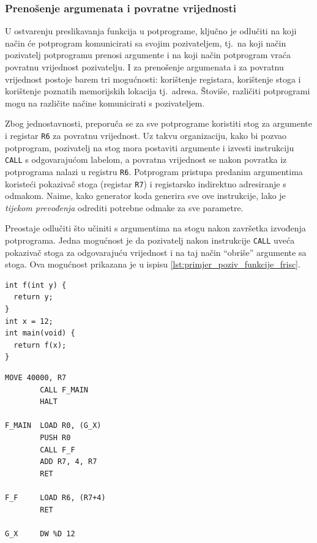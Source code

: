 \documentclass[times, 12pt, utf8]{book}
\begin{document}
\subsubsection{Prenošenje argumenata i povratne vrijednosti}\label{sec:argumenti_i_povratne_vrijednosti}
U ostvarenju preslikavanja funkcija u potprograme, ključno je odlučiti na koji način će potprogram komunicirati sa svojim pozivateljem, tj.~na koji način pozivatelj potprogramu prenosi argumente i na koji način potprogram vraća povratnu vrijednost pozivatelju.
I za prenošenje argumenata i za povratnu vrijednost postoje barem tri mogućnosti: korištenje registara, korištenje stoga i korištenje poznatih memorijskih lokacija tj.~adresa.
Štoviše, različiti potprogrami mogu na različite načine komunicirati s pozivateljem.

Zbog jednostavnosti, preporuča se za sve potprograme koristiti stog za argumente i registar \verb|R6| za povratnu vrijednost.
Uz takvu organizaciju, kako bi pozvao potprogram, pozivatelj na stog mora postaviti argumente i izvesti instrukciju \verb|CALL| s odgovarajućom labelom, a povratna vrijednost se nakon povratka iz potprograma nalazi u registru \verb|R6|.
Potprogram pristupa predanim argumentima koristeći pokazivač stoga (registar \verb|R7|) i registarsko indirektno adresiranje s odmakom.
Naime, kako generator koda generira sve ove instrukcije, lako je \emph{tijekom prevođenja} odrediti potrebne odmake za sve parametre.

Preostaje odlučiti što učiniti s argumentima na stogu nakon završetka izvođenja potprograma.
Jedna mogućnost je da pozivatelj nakon instrukcije \verb|CALL| uveća pokazivač stoga za odgovarajuću vrijednost i na taj način ``obriše'' argumente sa stoga.
Ova mogućnost prikazana je u ispisu \ref{lst:primjer_poziv_funkcije_frisc}.

\begin{lstlisting}[caption={Jednostavan \emph{ppjC} program s pozivom funkcije.},label=lst:primjer_poziv_funkcije]
int f(int y) {
  return y;
}
int x = 12;
int main(void) {
  return f(x);
}
\end{lstlisting}

\begin{lstlisting}[caption={Mogući generirani FRISC mnemonički program za ispis \ref{lst:primjer_poziv_funkcije}.},label=lst:primjer_poziv_funkcije_frisc]
        MOVE 40000, R7
        CALL F_MAIN
        HALT
        
F_MAIN  LOAD R0, (G_X)
        PUSH R0
        CALL F_F
        ADD R7, 4, R7
        RET

F_F     LOAD R6, (R7+4)
        RET

G_X     DW %D 12
\end{lstlisting}
\end{document}
